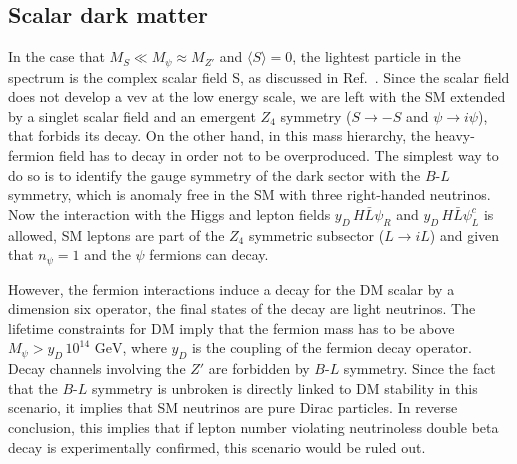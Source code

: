 \documentclass[aps,prd,twocolumn,preprintnumbers,superscriptaddress,nobibnotes,floatfix,longbibliography]{revtex4-1}
\begin{document}
\subsection{Scalar dark matter}
In the case that $M_S \ll M_\psi \approx M_{Z'}$ and $\langle S \rangle = 0$, the lightest particle in the spectrum is the complex scalar field S, as discussed in Ref.~\cite{1306.4710}. Since the scalar field does not develop a vev at the low energy scale, we are left with the SM extended by a singlet scalar field and an emergent $Z_4$ symmetry ($S \rightarrow - S $ and $\psi \rightarrow i \psi $), that forbids its decay. On the other hand, in this mass hierarchy, the heavy-fermion field has to decay in order not to be overproduced. The simplest way to do so is to identify the gauge symmetry of the dark sector with the $B$-$L$ symmetry, which is anomaly free in the SM with three right-handed neutrinos.  Now the interaction with the Higgs and lepton fields $y_D\,H \bar{L} \psi_R$ and $y_D\, H \bar{L} \psi_L^c$ is allowed, SM leptons are part of the $Z_4$ symmetric subsector  ($L \rightarrow i L$) and given that $n_\psi = 1$ and the $\psi$ fermions can decay.  

However, the fermion interactions induce a decay for the DM scalar by a dimension six operator, the final states of the decay are light neutrinos. The lifetime constraints for DM imply that the fermion mass has to be above  $ M_\psi > y_D\, 10^{14} \text{ GeV}$, where $y_D$ is the coupling of the fermion decay operator.  Decay channels involving the $Z'$ are forbidden by  $B$-$L$ symmetry. 
Since the fact that the $B$-$L$ symmetry is unbroken is directly linked to DM stability in this scenario, it implies that SM neutrinos are pure Dirac particles. In reverse conclusion, this implies that if lepton number violating neutrinoless double beta decay is experimentally confirmed, this scenario would be ruled out.
 
\end{document}
